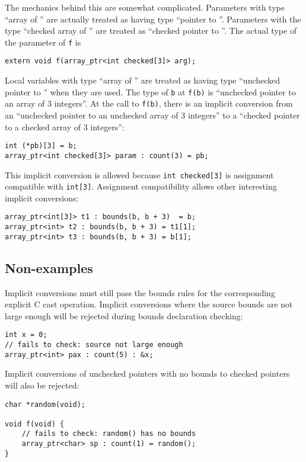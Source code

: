 The mechanics behind this are somewhat complicated.  Parameters with type
``array of '' are actually treated as having type ``pointer to ''.
Parameters with the type ``checked array of '' are treated as ``checked
pointer to ''.  The actual type of the parameter of \texttt{f} is
\begin{verbatim}
extern void f(array_ptr<int checked[3]> arg);
\end{verbatim}
Local variables with type ``array of '' are treated as having
type ``unchecked pointer to '' when they are used.  The type of
\texttt{b} at \texttt{f(b)} is ``unchecked pointer to an array of 3 integers''.
At the call to  \texttt{f(b)}, there is an implicit conversion from an
``unchecked pointer to an unchecked array of 3 integers'' to a ``checked pointer
to a checked array of 3 integers'':
\begin{verbatim}
int (*pb)[3] = b;
array_ptr<int checked[3]> param : count(3) = pb;
\end{verbatim}
This implicit conversion is allowed because \verb|int checked[3]| is assignment
compatible with \verb|int[3]|.  Assignment compatibility allows other
interesting implicit conversions:
\begin{verbatim}
array_ptr<int[3]> t1 : bounds(b, b + 3)  = b;
array_ptr<int> t2 : bounds(b, b + 3) = t1[1];
array_ptr<int> t3 : bounds(b, b + 3) = b[1];
\end{verbatim}

\subsection{Non-examples}

Implicit conversions must still pass the bounds rules for the corresponding explicit
C cast operation.  Implicit conversions where the source bounds are not large
enough will be rejected during bounds declaration checking:
\begin{verbatim}
int x = 0;
// fails to check: source not large enough
array_ptr<int> pax : count(5) : &x;
\end{verbatim}

Implicit conversions of unchecked pointers with no bounds to checked pointers
will also be rejected:
\begin{verbatim}
char *random(void);

void f(void) {
    // fails to check: random() has no bounds
    array_ptr<char> sp : count(1) = random(); 
}
\end{verbatim}

